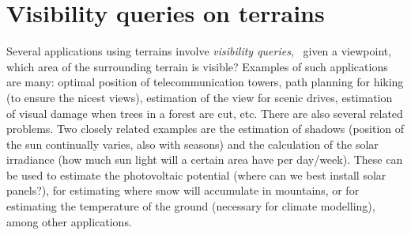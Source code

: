 
\setchapterpreamble[u]{\margintoc}


\chapter{Visibility queries on terrains}%
\label{chap:visibility}

\graphicspath{{visibility/figs}}

Several applications using terrains involve \emph{visibility queries}, \ie\ given a viewpoint, which area of the surrounding terrain is visible?
Examples of such applications are many: optimal position of telecommunication towers, path planning for hiking (to ensure the nicest views), estimation of the view for scenic drives, estimation of visual damage when trees in a forest are cut, etc.
There are also several related problems.
Two closely related examples are the estimation of shadows (position of the sun continually varies, also with seasons) and the calculation of the solar irradiance (how much sun light will a certain area have per day/week).
These can be used to estimate the photovoltaic potential (where can we best install solar panels?), for estimating where snow will accumulate in mountains, or for estimating the temperature of the ground (necessary for climate modelling), among other applications.

%


